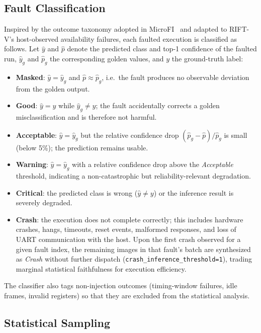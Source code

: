 \documentclass[conference]{IEEEtran}
\begin{document}
\subsection{Fault Classification}
\label{subsec:fault_classification}

Inspired by the outcome taxonomy adopted in MicroFI~\cite{de2025MicroFI} and adapted to RIFT-V's host-observed availability failures, each faulted execution is classified as follows. Let $\hat{y}$ and $\hat{p}$ denote the predicted class and top-1 confidence of the faulted run, $\hat{y}_g$ and $\hat{p}_g$ the corresponding golden values, and $y$ the ground-truth label:
\begin{itemize}
    \item \textbf{Masked}: $\hat{y}=\hat{y}_g$ and $\hat{p}\approx\hat{p}_g$, i.e.\ the fault produces no observable deviation from the golden output.
    \item \textbf{Good}: $\hat{y}=y$ while $\hat{y}_g\neq y$; the fault accidentally corrects a golden misclassification and is therefore not harmful.
    \item \textbf{Acceptable}: $\hat{y}=\hat{y}_g$ but the relative confidence drop $(\hat{p}_g-\hat{p})/\hat{p}_g$ is small (below 5\%); the prediction remains usable.
    \item \textbf{Warning}: $\hat{y}=\hat{y}_g$ with a relative confidence drop above the \emph{Acceptable} threshold, indicating a non-catastrophic but reliability-relevant degradation.
    \item \textbf{Critical}: the predicted class is wrong ($\hat{y}\neq y$) or the inference result is severely degraded.
    \item \textbf{Crash}: the execution does not complete correctly; this includes hardware crashes, hangs, timeouts, reset events, malformed responses, and loss of UART communication with the host. Upon the first crash observed for a given fault index, the remaining images in that fault's batch are synthesized as \textit{Crash} without further dispatch (\texttt{crash\_inference\_threshold=1}), trading marginal statistical faithfulness for execution efficiency.
\end{itemize}
The classifier also tags non-injection outcomes (timing-window failures, idle frames, invalid registers) so that they are excluded from the statistical analysis.

\subsection{Statistical Sampling}
\label{subsec:statistical_sampling}
\end{document}
